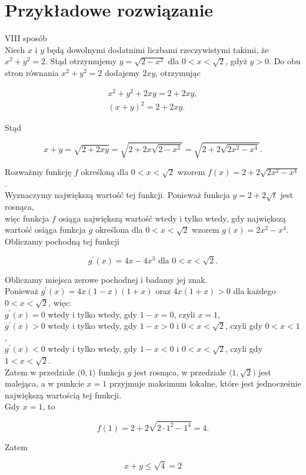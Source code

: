 \documentclass[10pt]{article}
\begin{document}
\section*{Przykładowe rozwiązanie}
VIII sposób\\
Niech $x$ i $y$ będą dowolnymi dodatnimi liczbami rzeczywistymi takimi, że $x^{2}+y^{2}=2$. Stąd otrzymujemy $y=\sqrt{2-x^{2}}$ dla $0<x<\sqrt{2}$, gdyż $y>0$. Do obu stron równania $x^{2}+y^{2}=2$ dodajemy $2 x y$, otrzymując

$$
\begin{gathered}
x^{2}+y^{2}+2 x y=2+2 x y, \\
(x+y)^{2}=2+2 x y .
\end{gathered}
$$

Stąd

$$
x+y=\sqrt{2+2 x y}=\sqrt{2+2 x \sqrt{2-x^{2}}}=\sqrt{2+2 \sqrt{2 x^{2}-x^{4}}} .
$$

Rozważmy funkcję $f$ określoną dla $0<x<\sqrt{2}$ wzorem $f(x)=2+2 \sqrt{2 x^{2}-x^{4}}$.\\
Wyznaczymy największą wartość tej funkcji. Ponieważ funkcja $y=2+2 \sqrt{t}$ jest rosnąca,\\
więc funkcja $f$ osiąga największą wartość wtedy i tylko wtedy, gdy największą wartość osiąga funkcja $g$ określona dla $0<x<\sqrt{2}$ wzorem $g(x)=2 x^{2}-x^{4}$. Obliczamy pochodną tej funkcji

$$
g^{\prime}(x)=4 x-4 x^{3} \text { dla } 0<x<\sqrt{2} .
$$

Obliczamy miejsca zerowe pochodnej i badamy jej znak.\\
Ponieważ $g^{\prime}(x)=4 x(1-x)(1+x)$ oraz $4 x(1+x)>0$ dla każdego $0<x<\sqrt{2}$, więc:\\
$g^{\prime}(x)=0$ wtedy i tylko wtedy, gdy $1-x=0$, czyli $x=1$,\\
$g^{\prime}(x)>0$ wtedy i tylko wtedy, gdy $1-x>0$ i $0<x<\sqrt{2}$, czyli gdy $0<x<1$,\\
$g^{\prime}(x)<0$ wtedy i tylko wtedy, gdy $1-x<0$ i $0<x<\sqrt{2}$, czyli gdy $1<x<\sqrt{2}$.\\
Zatem w przedziale $(0,1\rangle$ funkcja $g$ jest rosnąca, w przedziale $\langle 1, \sqrt{2})$ jest malejąca, a w punkcie $x=1$ przyjmuje maksimum lokalne, które jest jednocześnie największą wartością tej funkcji.\\
Gdy $x=1$, to

$$
f(1)=2+2 \sqrt{2 \cdot 1^{2}-1^{4}}=4 .
$$

Zatem

$$
x+y \leq \sqrt{4}=2
$$
\end{document}
